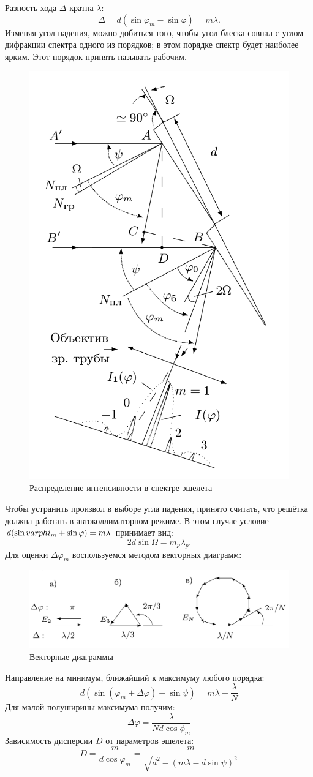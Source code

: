 \documentclass[10pt, a4paper]{article}
\begin{document}
Разность хода $\Delta$ кратна $\lambda$:
\[
\Delta = d (\sin \varphi_m - \sin \varphi) = m \lambda.
\]
Изменяя угол падения, можно добиться того, чтобы угол блеска совпал с углом дифракции спектра одного из порядков; в этом порядке спектр будет наиболее ярким. Этот порядок принять называть рабочим.
\begin{figure}[H]
	\includegraphics[width = 0.5\linewidth]{3.png}
	\caption*{Распределение интенсивности в спектре эшелета}
\end{figure}

Чтобы устранить произвол в выборе угла падения, принято считать, что решётка должна работать в автоколлиматорном режиме. В этом случае условие $d(\sin \\varphi_m + \sin \varphi) = m \lambda$ принимает вид:
\[
	2d \sin \Omega = m_p \lambda_p.
\]
Для оценки $\Delta \varphi_m$ воспользуемся методом векторных диаграмм:
\begin{figure}[H]
	\includegraphics[width = 1.0\linewidth]{2.png}
	\caption*{Векторные диаграммы}
\end{figure}
Направление на минимум, ближайший к максимуму любого порядка:
\[
d(\sin(\varphi_m + \Delta \varphi) + \sin \psi) = m \lambda + \frac{\lambda}{N}
\]
Для малой полуширины максимума получим:
\[
\Delta \varphi = \frac{\lambda}{Nd\cos \phi_m}
\]
Зависимость дисперсии $D$ от параметров эшелета:
\[
D = \frac{m}{d \cos \varphi_m} = \frac{m}{\sqrt{d^2 - (m \lambda - d \sin \psi)^2}}
\]
\end{document}
